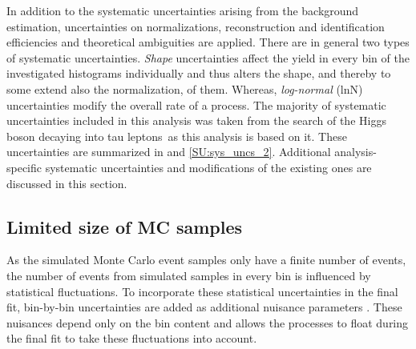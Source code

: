 In addition to the systematic uncertainties arising from the background estimation, uncertainties on normalizations, reconstruction and identification efficiencies and theoretical ambiguities are applied.
There are in general two types of systematic uncertainties. \textit{Shape} uncertainties affect the yield in every bin of the investigated histograms individually and thus alters the shape, and thereby to some extend also the normalization, of them.
Whereas, \textit{log-normal} (lnN) uncertainties modify the overall rate of a process.
The majority of systematic uncertainties included in this analysis was taken from the search of the Higgs boson decaying into tau leptons\,\cite{Sirunyan:2017khh} as this analysis is based on it. These uncertainties are summarized in  and \ref{SU:sys_uncs_2}. Additional analysis-specific systematic uncertainties
and modifications of the existing ones are discussed in this section.

\subsection{Limited size of MC samples}
As the simulated Monte Carlo event samples only have a finite number of events, the number of events from simulated samples in every bin is influenced by 
statistical fluctuations. To incorporate these statistical uncertainties in the final fit, bin-by-bin uncertainties are added as
additional nuisance parameters \cite{BARLOW1993219,bbb_conway}. These nuisances depend only on the bin content and allows the processes to float during the final fit to take these fluctuations into account.

